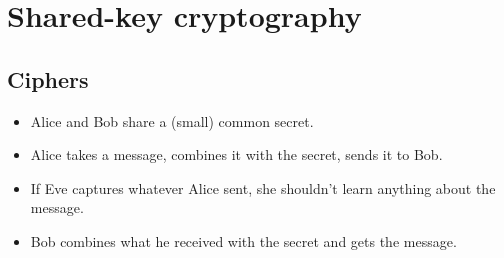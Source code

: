 \mode*




\section{Shared-key cryptography}

\subsection{Ciphers}

\begin{frame}
  \begin{idea}
    \begin{itemize}
      \item Alice and Bob share a (small) common secret.

        \pause{}

      \item Alice takes a message, combines it with the secret, sends it to 
        Bob.

        \pause{}

      \item If Eve captures whatever Alice sent, she shouldn't learn anything 
        about the message.

        \pause{}

      \item Bob combines what he received with the secret and gets the message.
    \end{itemize}
  \end{idea}
\end{frame}

